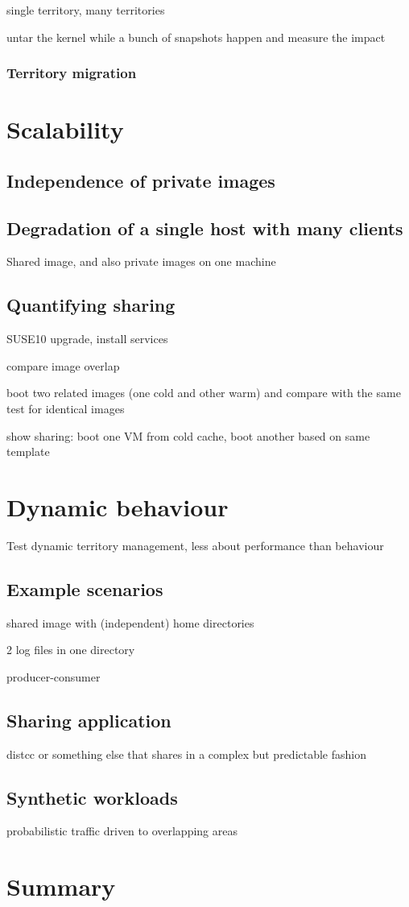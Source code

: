single territory, many territories

untar the kernel while a bunch of snapshots happen and measure the impact

\subsubsection{Territory migration}

\section{Scalability}
\subsection{Independence of private images}
\subsection{Degradation of a single host with many clients}
Shared image, and also private images on one machine

\subsection{Quantifying sharing}\label{sec:quantifying-sharing}

SUSE10 upgrade, install services

compare image overlap

boot two related images (one cold and other warm) and compare with the same test for identical images

show sharing: boot one VM from cold cache, boot another based on same template

\section{Dynamic behaviour}

Test dynamic territory management, less about performance than behaviour

\subsection{Example scenarios}

shared image with (independent) home directories

2 log files in one directory

producer-consumer

\subsection{Sharing application}
distcc or something else that shares in a complex but predictable fashion

\subsection{Synthetic workloads}

probabilistic traffic driven to overlapping areas

\section{Summary}
